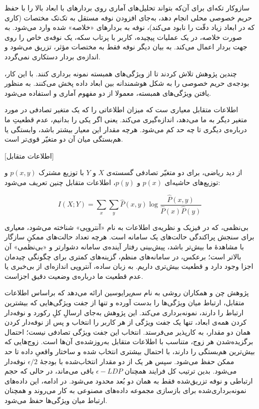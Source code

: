 سازوکار تکه‌ای برای آن‌که بتواند تحلیل‌های آماری روی بردارهای با ابعاد بالا را با حفظ حریم خصوصی محلی انجام دهد، به‌جای افزودن نوفه مستقل به تک‌تک مختصات (کاری که در ابعاد زیاد دقّت را نابود می‌کند)، نوفه به بردارهای «خلاصه» شده وارد می‌شود. به صورت خلاصه، در یک عملیات پیچیده، کاربر با پرتاب سکه، یک نوفه‌ی خاص را روی جهت بردار اعمال می‌کند. به بیان دیگر نوفه فقط به مختصات مؤثر، تزریق می‌شود و اندازه‌ی بردار دستکاری نمی‌گردد.

چندین پژوهش تلاش کردند تا از ویژگی‌های همبسته نمونه برداری کنند. با این کار، بودجه‌ی حریم خصوصی را به شکل هوشمندانه بین ابعاد داده پخش می‌کنند. به منظور یافتن ویژگی‌های همبسته، معمولا از دو مفهوم آماری  و  استفاده می‌شود. 

اطلاعات متقابل معیاری ست که میزان اطلاعاتی را که یک متغیر تصادفی در مورد متغیر دیگر به ما می‌دهد، اندازه‌گیری می‌کند. یعنی اگر یکی را بدانیم، عدم قطعیتِ ما درباره‌ی دیگری تا چه حد کم می‌شود. هرچه مقدار این معیار بیشتر باشد، وابستگی یا هم‌بستگی میان آن دو متغیّر قوی‌تر است.

[اطلاعات متقابل]

از دید ریاضی، برای دو متغیّر تصادفی گسسته‌ی $X$ و $Y$ با توزیع مشترک $p(x,y)$ و توزیع‌های حاشیه‌ای $p(x)$ و $p(y)$، اطلاعات متقابل چنین تعریف می‌شود:

\begin{equation}
I(X;Y) = \sum_{x} \sum_{y} \hat{P}(x, y) \log \frac{\hat{P}(x, y)}{\hat{P}(x) \hat{P}(y)}
\label{equ:mutual}
\end{equation}


بی‌نظمی، که در فیزیک و نظریه‌ی اطلاعات به نام «آنتروپی» شناخته می‌شود، معیاری برای سنجش پراکندگی حالت‌های یک سامانه است. هرچه تعداد حالت‌های ممکنِ سازگار با مشاهدهٔ ما بیش‌تر باشد، پیش‌بینی رفتار آینده‌ی سامانه دشوارتر و «بی‌نظمی» آن بالاتر است؛ برعکس، در سامانه‌های منظم، گزینه‌های کمتری برای چگونگی چیدمان اجزا وجود دارد و قطعیت بیش‌تری داریم. به زبان ساده، آنتروپی اندازه‌ای از بی‌خبری یا عدم قطعیت ما درباره‌ی وضعیت دقیق اجزاست.


پژوهش چن و همکاران  روشی به نام سم‌پرایو‌سین ارائه می‌دهد که براساس اطلاعات متقابل، ارتباط میان ویژگی‌ها را بدست آورده و تنها از جفت ویژگی‌هایی که بیشترین ارتباط را دارند، نمونه‌برداری می‌کند. این پژوهش به‌جای ارسالِ کلِ رکورد و نوفه‌دار کردن همه‌ی ابعاد، تنها یک جفت ویژگی از هر کاربر را انتخاب و پس از نوفه‌دار کردن همان دو مقدار، به کارپذیر می‌فرستد. انتخاب این جفت ویژگی تصادفی نیست؛ احتمال برگزیده‌شدن هر زوج، متناسب با اطلاعات متقابل به‌روز‌شده‌ی آن‌ها است. زوج‌هایی که بیش‌ترین هم‌بستگی را دارند، با احتمال بیشتری انتخاب شده و ساختار واقعیِ داده تا حد ممکن حفظ می‌شود. سپس هر یک از دو مقدار انتخاب‌شده با بودجهٔ $\epsilon / 2$ نوفه‌دار می‌شود. بدین ترتیب کل فرایند همچنان $\epsilon {-}LDP$ باقی می‌ماند، در حالی که حجم ارتباطی و نوفه تزریق‌شده فقط به همان دو بُعد محدود می‌شود. در ادامه، این داده‌های نمونه‌برداری‌شده برای بازسازی مجموعه داده‌های مصنوعی به کار می‌روند و همچنان ارتباط میان ویژگی‌ها حفظ می‌شود.

